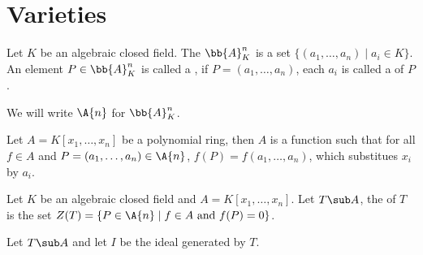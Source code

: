 \documentclass[10pt]{article}
\begin{document}
\def\htitle{Algebraic Geometry}
\def\hauthor{Hassium}
\hsetup
\htoc
\hmain
\section{Varieties}
\begin{definition}
    Let $K$ be an algebraic closed field. The  ${\bb{A}}_{K}^{n}$ is a set $\{({a}_{1},\dots,{a}_{n})\mid{a}_{i}\in K\}$. An element $P\in{\bb{A}}_{K}^{n}$ is called a , if $P=({a}_{1},\dots,{a}_{n})$, each ${a}_{i}$ is called a  of $P$.
\end{definition}
\begin{remark}
    We will write $\A{n}$ for ${\bb{A}}_{K}^{n}$.
\end{remark}
\par
Let $A=K[{x}_{1},\dots,{x}_{n}]$ be a polynomial ring, then $A$ is a function such that for all $f\in A$ and $P=({a}_{1},\dots,{a}_{n})\in\A{n}$, $f(P)=f({a}_{1},\dots,{a}_{n})$, which substitues ${x}_{i}$ by ${a}_{i}$. 
\begin{definition}
    Let $K$ be an algebraic closed field and $A=K[{x}_{1},\dots,{x}_{n}]$. Let $T\sub A$, the  of $T$ is the set $Z(T)=\{P\in\A{n}\mid f\in A\ \text{and}\ f(P)=0\}$.
\end{definition}
\par
Let $T\sub A$ and let $I$ be the ideal generated by $T$. 









\hindex
\end{document}
